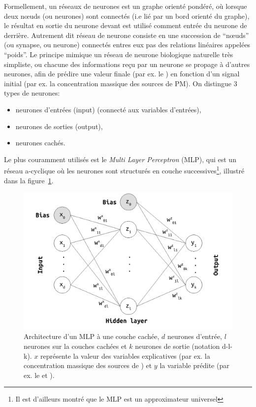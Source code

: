 Formellement, un réseaux de neurones est un graphe orienté pondéré, où lorsque deux
nœuds (ou neurones) sont connectés (i.e lié par un bord orienté du graphe), le résultat en
sortie du neurone devant est utilisé comment entrée du neurone de derrière.
Autrement dit réseau de neurone consiste en une succession de ``nœuds'' (ou synapse, ou
neurone) connectés entres eux pas des relations linéaires appelées ``poids''. Le principe
mimique un réseau de neurone biologique naturelle très simpliste, ou chacune des
informations reçu par un neurone se propage à d'autres neurones, afin de prédire une
valeur finale (par ex. le \POv) en fonction d'un signal initial (par ex. la
concentration massique des sources de PM).
On distingue 3 types de neurones:
\begin{itemize}
    \item neurones d'entrées (input) (connecté aux variables d'entrées),
    \item neurones de sorties (output),
    \item neurones cachés.
\end{itemize}
Le plus couramment utilisés est le \textit{Multi Layer Perceptron} (MLP), qui est un
réseau a-cyclique où les neurones sont structurés en couche successives\footnote{Il est
d'ailleurs montré que le MLP est un approximateur universel}, illustré dans la
figure~\ref{fig:MLP_architecture}.

\begin{figure}[ht]
    \centering
    \includegraphics[width=0.7\linewidth]{figures/chapter05/MLP_architecture.pdf}
    \caption{Architecture d'un MLP à une couche cachée, $d$ neurones d'entrée, $l$
    neurones sur la couches cachées et $k$ neurones de sortie (notation d-l-k). $x$
    représente la valeur des variables explicatives (par ex. la concentration massique des
    sources de \PMdix) et $y$ la variable prédite (par ex. le \POAAv{} et \PODTTv).}%
    \label{fig:MLP_architecture}
\end{figure}

